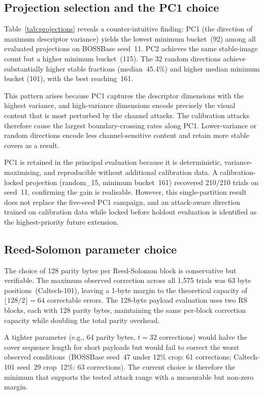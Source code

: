 \documentclass[10pt,journal]{IEEEtran}
\begin{document}
\subsection{Projection selection and the PC1 choice}
\label{subsec:projection}

Table~\ref{tab:projections} reveals a counter-intuitive finding:
PC1 (the direction of maximum descriptor variance) yields the lowest
minimum bucket~(92) among all evaluated projections on BOSSBase
seed~11. PC2 achieves the same stable-image count but a higher minimum
bucket~(115). The 32 random directions achieve substantially higher
stable fractions (median~45.4\%) and higher median minimum bucket
(101), with the best reaching~161.

This pattern arises because PC1 captures the descriptor dimensions
with the highest variance, and high-variance dimensions encode
precisely the visual content that is most perturbed by the channel
attacks. The calibration attacks therefore cause the largest
boundary-crossing rates along PC1. Lower-variance or random
directions encode less channel-sensitive content and retain more
stable covers as a result.

PC1 is retained in the principal evaluation because it is
deterministic, variance-maximising, and reproducible without
additional calibration data. A calibration-locked projection
(random\_15, minimum bucket~161) recovered 210/210 trials on seed~11,
confirming the gain is realisable. However, this single-partition
result does not replace the five-seed PC1 campaign, and an attack-aware
direction trained on calibration data while locked before holdout
evaluation is identified as the highest-priority future extension.

\subsection{Reed-Solomon parameter choice}
\label{subsec:rs}

The choice of 128 parity bytes per Reed-Solomon block is conservative
but verifiable. The maximum observed correction across all 1{,}575
trials was 63 byte positions~(Caltech-101), leaving a 1-byte margin
to the theoretical capacity of $\lfloor 128/2\rfloor{=}64$
correctable errors. The 128-byte payload evaluation uses two RS blocks,
each with 128 parity bytes, maintaining the same per-block correction
capacity while doubling the total parity overhead.

A tighter parameter (e.g., 64 parity bytes, $t{=}32$ corrections)
would halve the cover sequence length for short payloads but would
fail to correct the worst observed conditions~(BOSSBase seed~47 under
12\% crop: 61 corrections; Caltech-101 seed~29 crop~12\%: 63
corrections). The current choice is therefore the minimum that supports
the tested attack range with a measurable but non-zero margin.
\end{document}
